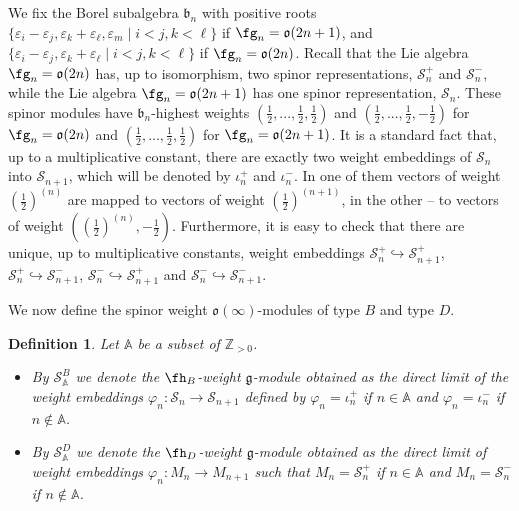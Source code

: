 \documentclass[12pt]{amsart}
\def\gb{\mathfrak{b}}
\def\gg{\mathfrak{g}}
\newtheorem{defn}[thm]{Definition}
\begin{document}
We fix the Borel subalgebra $\gb_n$ with positive roots $\{ \varepsilon_i - \varepsilon_j, \varepsilon_k + \varepsilon_{\ell}, \varepsilon_m \; | \; i<j, k< \ell\}$ if  $\fg_n=\mathfrak{o}(2n+1)$, and $\{ \varepsilon_i - \varepsilon_j, \varepsilon_k + \varepsilon_{\ell} \; | \; i<j, k< \ell\}$ if  $\fg_n=\mathfrak{o}(2n)$. Recall that the Lie algebra $\fg_n=\mathfrak{o}(2n)$ has, up to isomorphism, two spinor representations, ${\mathcal S}_n^+$ and ${\mathcal S}_n^-$, while the  Lie algebra $\fg_n=\mathfrak{o}(2n+1)$ has one spinor representation, ${\mathcal S}_n$. These spinor modules have $\gb_n$-highest weights $\left(\frac{1}{2},..., \frac{1}{2},\frac{1}{2}\right)$ and $\left(\frac{1}{2},..., \frac{1}{2},-\frac{1}{2}\right)$ for $\fg_n=\mathfrak{o}(2n)$  and $\left(\frac{1}{2},..., \frac{1}{2},\frac{1}{2}\right)$  for $\fg_n=\mathfrak{o}(2n+1)$. It is a standard fact
 that, up to a multiplicative constant, there are exactly two weight embeddings of ${\mathcal S}_n$ into ${\mathcal S}_{n+1}$, which will be denoted by $\iota_n^+$ and $\iota_n^-$. In one of them vectors of weight $\left( \frac{1}{2}\right)^{(n)}$ are mapped to vectors of weight $\left( \frac{1}{2}\right)^{(n+1)}$, in the other -- to vectors of weight  $\left(  \left( \frac{1}{2}\right)^{(n)}, -\frac{1}{2}\right)$. Furthermore, it is easy to check that there are unique, up to multiplicative constants, weight embeddings  ${\mathcal S}_n^+ \hookrightarrow  {\mathcal S}_{n+1}^+$, ${\mathcal S}_n^+ \hookrightarrow  {\mathcal S}_{n+1}^-$, ${\mathcal S}_n^- \hookrightarrow  {\mathcal S}_{n+1}^+$  and  ${\mathcal S}_n^- \hookrightarrow  {\mathcal S}_{n+1}^-$. 

We now define the spinor weight $\mathfrak{o}(\infty)$-modules  of type $B$ and type $D$. 
\begin{defn} Let ${\mathbb A}$ be a subset of $\mathbb{Z}_{>0}$.
\begin{itemize}
\item[(i)] By ${\mathcal S}_{\mathbb A}^B$ we denote the $\fh_B$-weight $\gg$-module obtained as the direct limit of  the weight embeddings $\varphi_n : {\mathcal S}_n \to {\mathcal S}_{n+1}$ defined  by  $\varphi_n = \iota_n^+$ if $n \in {\mathbb A}$  and $\varphi_n = \iota_n^-$ if $n\notin {\mathbb A}$.
\item[(ii)] By ${\mathcal S}_{\mathbb A}^D$ we denote the $\fh_D$-weight  $\gg$-module obtained as the direct limit of  weight embeddings $\varphi_n : M_n \to M_{n+1}$ such that $M_n = {\mathcal S}_n^+$ if $n \in {\mathbb A}$ and $M_n = {\mathcal S}_n^-$ if $n \notin {\mathbb A}$.
\end{itemize}
\end{defn}
\end{document}
